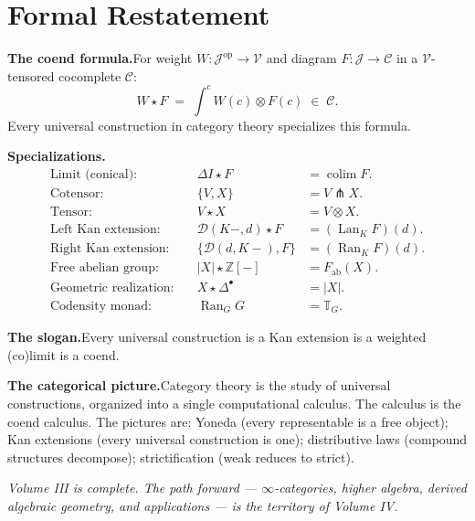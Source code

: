 \section*{Formal Restatement}

\begin{formalrestatement}
\textbf{The coend formula.}\quad For weight $W : \mathcal{J}^{\mathrm{op}}
\to \mathcal{V}$ and diagram $F : \mathcal{J} \to \mathcal{C}$ in a
$\mathcal{V}$-tensored cocomplete $\mathcal{C}$:
\[
  W \star F \;=\; \int^c W(c) \otimes F(c) \;\in\; \mathcal{C}.
\]
Every universal construction in category theory specializes this formula.

\medskip
\textbf{Specializations.}\quad
\begin{align*}
  \text{Limit (conical):} \quad & \Delta I \star F &= \operatorname{colim} F. \\
  \text{Cotensor:} \quad & \{V, X\} &= V \pitchfork X. \\
  \text{Tensor:} \quad & V \star X &= V \otimes X. \\
  \text{Left Kan extension:} \quad & \mathcal{D}(K-, d) \star F &= (\operatorname{Lan}_K F)(d). \\
  \text{Right Kan extension:} \quad & \{\mathcal{D}(d, K-), F\} &= (\operatorname{Ran}_K F)(d). \\
  \text{Free abelian group:} \quad & |X| \star \mathbb{Z}[-] &= F_{\mathrm{ab}}(X). \\
  \text{Geometric realization:} \quad & X \star \Delta^\bullet &= |X|. \\
  \text{Codensity monad:} \quad & \operatorname{Ran}_G G &= \mathbb{T}_G.
\end{align*}

\medskip
\textbf{The slogan.}\quad Every universal construction is a Kan extension is
a weighted (co)limit is a coend.

\medskip
\textbf{The categorical picture.}\quad Category theory is the study of
universal constructions, organized into a single computational calculus.
The calculus is the coend calculus. The pictures are: Yoneda (every
representable is a free object); Kan extensions (every universal construction
is one); distributive laws (compound structures decompose); strictification
(weak reduces to strict).

\medskip
\noindent\textit{Volume III is complete. The path forward —
$\infty$-categories, higher algebra, derived algebraic geometry, and
applications — is the territory of Volume IV.}
\end{formalrestatement}
